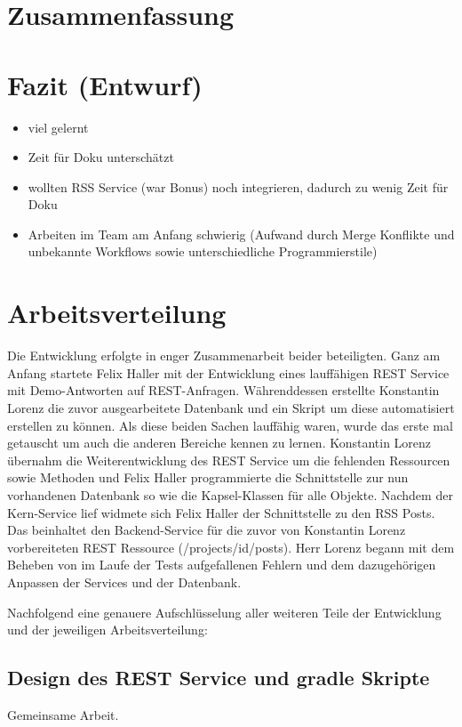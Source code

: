 \documentclass[12pt]{scrartcl}
\begin{document}
	\section{Zusammenfassung}
	\section{Fazit (Entwurf)}
		\begin{itemize}
			\item viel gelernt
			\item Zeit für Doku unterschätzt
			\item wollten RSS Service (war Bonus) noch integrieren, dadurch zu wenig Zeit für Doku
			\item Arbeiten im Team am Anfang schwierig (Aufwand durch Merge Konflikte und unbekannte Workflows sowie unterschiedliche Programmierstile)
		\end{itemize}
		
	\section{Arbeitsverteilung}
		
		Die Entwicklung erfolgte in enger Zusammenarbeit beider beteiligten. Ganz am Anfang startete Felix Haller mit der Entwicklung eines lauffähigen REST Service mit Demo-Antworten auf REST-Anfragen. Währenddessen erstellte Konstantin Lorenz die zuvor ausgearbeitete Datenbank und ein Skript um diese automatisiert erstellen zu können. Als diese beiden Sachen lauffähig waren, wurde das erste mal getauscht um auch die anderen Bereiche kennen zu lernen. Konstantin Lorenz übernahm die Weiterentwicklung des REST Service um die fehlenden Ressourcen sowie Methoden und Felix Haller programmierte die Schnittstelle zur nun vorhandenen Datenbank so wie die Kapsel-Klassen für alle Objekte.
		Nachdem der Kern-Service lief widmete sich Felix Haller der Schnittstelle zu den RSS Posts. Das beinhaltet den Backend-Service für die zuvor von Konstantin Lorenz vorbereiteten REST Ressource (/projects/{id}/posts). Herr Lorenz begann mit dem Beheben von im Laufe der Tests aufgefallenen Fehlern und dem dazugehörigen Anpassen der Services und der Datenbank.
		
		Nachfolgend eine genauere Aufschlüsselung aller weiteren Teile der Entwicklung und der jeweiligen Arbeitsverteilung:
	 
		
		\subsection{Design des REST Service und gradle Skripte}
			Gemeinsame Arbeit.
\end{document}
